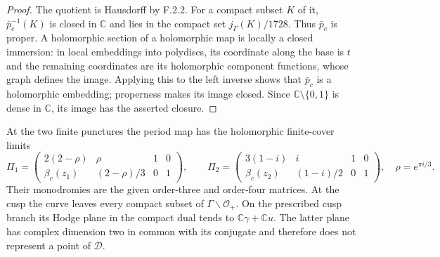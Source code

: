 \begin{proof}
The quotient is Hausdorff by F.2.2.  For a compact subset $K$ of it,
$\bar p_c^{-1}(K)$ is closed in $\mathbb C$ and lies in the compact set
$j_\Gamma(K)/1728$.  Thus $\bar p_c$ is proper.  A holomorphic section of
a holomorphic map is locally a closed immersion: in local embeddings
into polydiscs, its coordinate along the base is $t$ and the remaining
coordinates are its holomorphic component functions, whose graph
defines the image.  Applying this to the left inverse shows that
$\bar p_c$ is a holomorphic embedding; properness makes its image
closed.  Since $\mathbb C\setminus\{0,1\}$ is dense in $\mathbb C$, its
image has the asserted closure.
\end{proof}

\begin{proposition}\label{fam:src:F.3.2}\label{fam:st:F.3.2}
At the two finite punctures the period map has the holomorphic
finite-cover limits
\[
 \Pi_1=
 \begin{pmatrix}2(2-\rho)&\rho&1&0\\
 \beta_c(z_1)&(2-\rho)/3&0&1\end{pmatrix},\qquad
 \Pi_2=
 \begin{pmatrix}3(1-i)&i&1&0\\
 \beta_c(z_2)&(1-i)/2&0&1\end{pmatrix},
 \quad \rho=e^{\pi i/3}.
\]
Their monodromies are the given order-three and order-four matrices.
At the cusp the curve leaves every compact subset of
$\Gamma\backslash\mathcal O_+$.  On the prescribed cusp branch its
Hodge plane in the compact dual tends to
$\mathbb C\gamma+\mathbb Cu$.  The latter plane has complex dimension
two in common with its conjugate and therefore does not represent a
point of $\mathcal D$.
\end{proposition}

